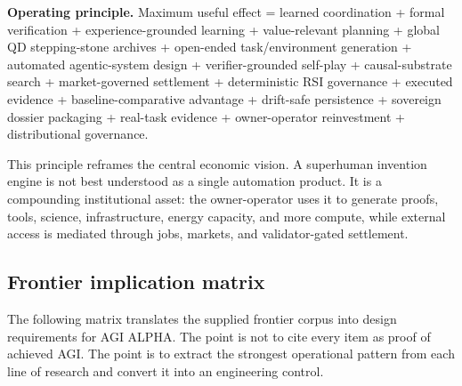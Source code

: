 \documentclass[
  11pt,
]{article}
\begin{document}
\textbf{Operating principle.} Maximum useful effect = learned
coordination + formal verification + experience-grounded learning +
value-relevant planning + global QD stepping-stone archives + open-ended
task/environment generation + automated agentic-system design +
verifier-grounded self-play + causal-substrate search + market-governed
settlement + deterministic RSI governance + executed evidence +
baseline-comparative advantage + drift-safe persistence + sovereign
dossier packaging + real-task evidence + owner-operator reinvestment +
distributional governance.

This principle reframes the central economic vision. A superhuman
invention engine is not best understood as a single automation product.
It is a compounding institutional asset: the owner-operator uses it to
generate proofs, tools, science, infrastructure, energy capacity, and
more compute, while external access is mediated through jobs, markets,
and validator-gated settlement.

\subsection{Frontier implication
matrix}\label{frontier-implication-matrix}

The following matrix translates the supplied frontier corpus into design
requirements for AGI ALPHA. The point is not to cite every item as proof
of achieved AGI. The point is to extract the strongest operational
pattern from each line of research and convert it into an engineering
control.
\end{document}
